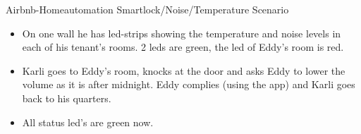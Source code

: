 \begin{frame}{Airbnb-Homeautomation Smartlock/Noise/Temperature Scenario}
\begin{scriptsize}
\begin{itemize}
his app).
\item On one wall he has led-strips showing the temperature and noise levels in each of his tenant’s rooms. 2 leds are green, the led of
Eddy’s room is red.
\item Karli goes to Eddy’s room, knocks at the door and asks Eddy to lower the volume as it is after midnight. Eddy complies (using the
app) and Karli goes back to his quarters.
\item All status led’s are green now.
\end{itemize}
\end{scriptsize}
\end{frame}
